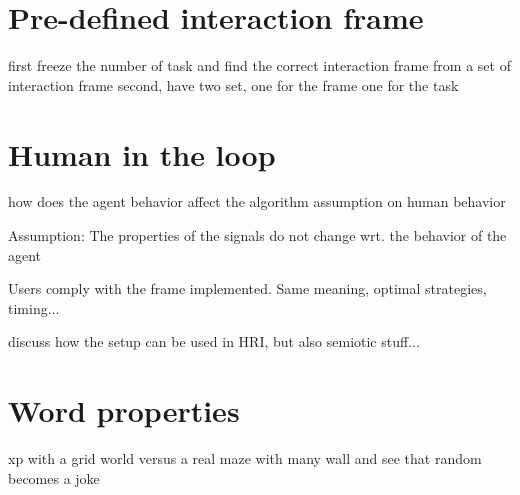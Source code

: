 \section{Pre-defined interaction frame}
first freeze the number of task and find the correct interaction frame from a set of interaction frame
second, have two set, one for the frame one for the task

\section{Human in the loop}
how does the agent behavior affect the algorithm assumption on human behavior

Assumption: The properties of the signals do not change wrt. the behavior of the agent

Users comply with the frame implemented. Same meaning, optimal strategies, timing...

discuss how the setup can be used in HRI, but also semiotic stuff...

\section{Word properties}
xp with a grid world versus a real maze with many wall and see that random becomes a joke




